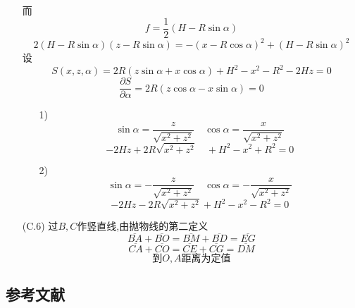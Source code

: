 \documentclass{article}
\begin{document}
\begin{itemize}
    而
    \[f=\dfrac12(H-R\sin\alpha)\]
    \[2(H-R\sin\alpha)(z-R\sin\alpha)=-(x-R\cos\alpha)^2+(H-R\sin\alpha)^2\]
    设\[S(x,z,\alpha)=2R(z\sin\alpha+x\cos\alpha)+H^2-x^2-R^2-2Hz=0\]
    \[\frac{\partial S}{\partial\alpha}=2R\left(z\cos\alpha-x\sin\alpha\right)=0\]
    \begin{itemize}
        \item[1)]\[\sin\alpha=\dfrac{z}{\sqrt{x^2+z^2}}\quad\cos\alpha=\dfrac{x}{\sqrt{x^2+z^2}}\]
        \[-2Hz+2R\sqrt{x^2+z^2}\quad+H^2-x^2+R^2=0\]
        \item[2)]\[\sin\alpha=-\dfrac{z}{\sqrt{x^2+z^2}}\quad\cos\alpha=-\dfrac{x}{\sqrt{x^2+z^2}}\]
        \[-2Hz-2R\sqrt{x^2+z^2}+H^2-x^2-R^2=0\]
    \end{itemize}
    \item[(C.6)]过$B,C$作竖直线,由抛物线的第二定义
    \[\overline{BA}+\overline{BO}=\overline{BM}+\overline{BD}=\overline{EG}\]
    \[\overline{CA}+\overline{CO}=\overline{CE}+\overline{CG}=\overline{DM}\]
    \[到O,A距离为定值\]
\end{itemize}
\subsection*{参考文献}


\end{document}

